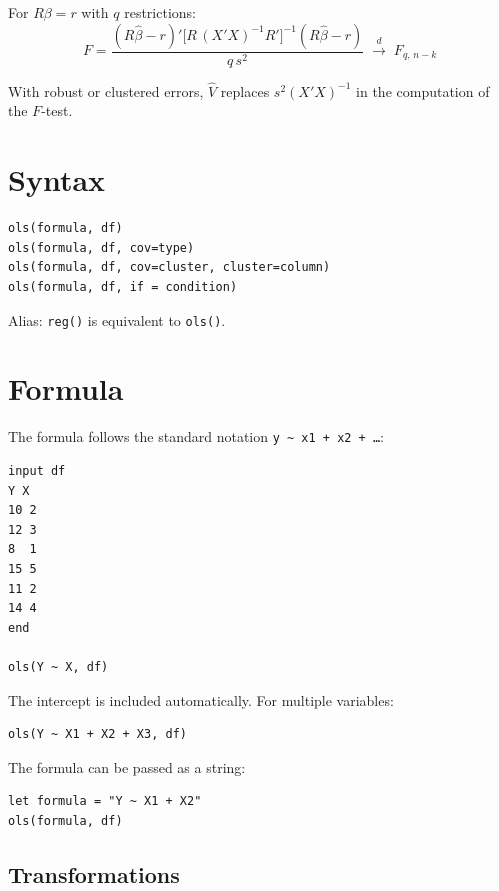 For $R\beta = r$ with $q$ restrictions:
\[
  F = \frac{(R\hat{\beta} - r)'
       \bigl[R\,(X'X)^{-1}R'\bigr]^{-1}
       (R\hat{\beta} - r)}{q\,s^2}
  \;\xrightarrow{d}\; F_{q,\,n-k}
\]

\begin{nota}
  With robust or clustered errors, $\hat{V}$ replaces $s^2(X'X)^{-1}$
  in the computation of the $F$-test.
\end{nota}

\section{Syntax}

\begin{lstlisting}
ols(formula, df)
ols(formula, df, cov=type)
ols(formula, df, cov=cluster, cluster=column)
ols(formula, df, if = condition)
\end{lstlisting}

Alias: \lstinline{reg()} is equivalent to \lstinline{ols()}.

\section{Formula}
\label{sec:ols-formula}

The formula follows the standard notation \texttt{y \textasciitilde{} x1 + x2 + \ldots}:

\begin{lstlisting}[caption={Basic OLS}]
input df
Y X
10 2
12 3
8  1
15 5
11 2
14 4
end

ols(Y ~ X, df)
\end{lstlisting}

The intercept is included automatically. For multiple variables:

\begin{lstlisting}
ols(Y ~ X1 + X2 + X3, df)
\end{lstlisting}

The formula can be passed as a string:

\begin{lstlisting}
let formula = "Y ~ X1 + X2"
ols(formula, df)
\end{lstlisting}

\subsection{Transformations}
\label{subsec:formula-transformations}


